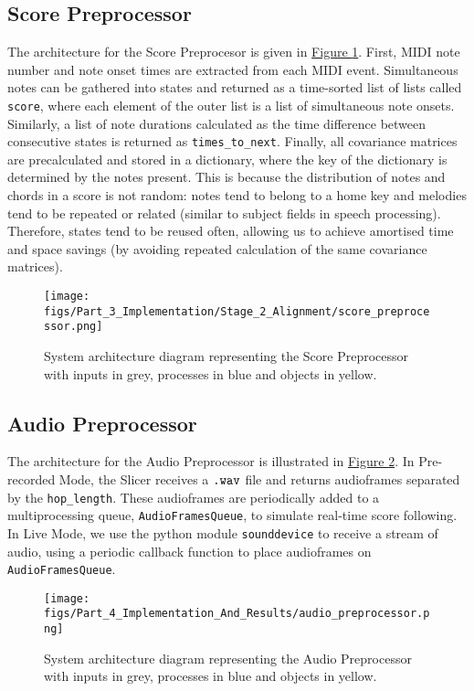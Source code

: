 \subsection{Score Preprocessor}
The architecture for the Score Preprocesor is given in \hyperref[fig:score_preprocessor]{Figure \ref*{fig:score_preprocessor}}. First, MIDI note number and note onset times are extracted from each MIDI event. Simultaneous notes can be gathered into states and returned as a time-sorted list of lists called \verb|score|, where each element of the outer list is a list of simultaneous note onsets. Similarly, a list of note durations calculated as the time difference between consecutive states is returned as \verb|times_to_next|. Finally, all covariance matrices are precalculated and stored in a dictionary, where the key of the dictionary is determined by the notes present. This is because the distribution of notes and chords in a score is not random: notes tend to belong to a home \gls{key} and melodies tend to be repeated or related (similar to subject fields in speech processing). Therefore, states tend to be reused often, allowing us to achieve amortised time and space savings (by avoiding repeated calculation of the same covariance matrices). 

\begin{figure}[H]
    \centering
    \texttt{[image: figs/Part\_3\_Implementation/Stage\_2\_Alignment/score\_preprocessor.png]}
    \caption{System architecture diagram representing the Score Preprocessor with inputs in grey, processes in blue and objects in yellow.}
    \label{fig:score_preprocessor}
\end{figure}


\subsection{Audio Preprocessor}
The architecture for the Audio Preprocessor is illustrated in \hyperref[fig:audio_preprocessor]{Figure \ref*{fig:audio_preprocessor}}. In Pre-recorded Mode, the Slicer receives a $\verb|.wav|$ file and returns audioframes separated by the \verb|hop_length|. These audioframes are periodically added to a multiprocessing queue, \verb|AudioFramesQueue|, to simulate real-time score following. In Live Mode, we use the python module \verb|sounddevice| to receive a stream of audio, using a periodic callback function to place audioframes on \verb|AudioFramesQueue|. 

\begin{figure}[H]
    \centering
    \texttt{[image: figs/Part\_4\_Implementation\_And\_Results/audio\_preprocessor.png]}
    \caption{System architecture diagram representing the Audio Preprocessor with inputs in grey, processes in blue and objects in yellow.}
    \label{fig:audio_preprocessor}
\end{figure}

